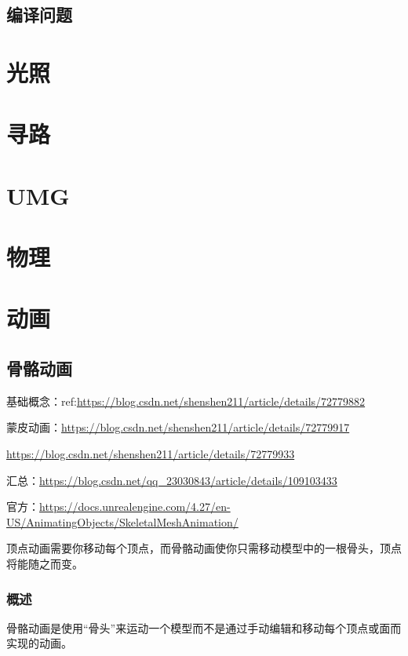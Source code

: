 \documentclass[UTF8,a4paper,12pt]{ctexbook}
\begin{document}
	\section{编译问题}
	
	




\chapter{光照}
	
\chapter{寻路}
	
\chapter{UMG}
		
\chapter{物理}
		
\chapter{动画}
	\section{骨骼动画}
	
		基础概念：ref:\url{https://blog.csdn.net/shenshen211/article/details/72779882}
		
		蒙皮动画：\url{https://blog.csdn.net/shenshen211/article/details/72779917}
		
		\url{https://blog.csdn.net/shenshen211/article/details/72779933}
		
		汇总：\url{https://blog.csdn.net/qq_23030843/article/details/109103433}
		
		官方：\url{https://docs.unrealengine.com/4.27/en-US/AnimatingObjects/SkeletalMeshAnimation/}
	
		顶点动画需要你移动每个顶点，而骨骼动画使你只需移动模型中的一根骨头，顶点将能随之而变。
		
		\subsection{概述}
			骨骼动画是使用“骨头”来运动一个模型而不是通过手动编辑和移动每个顶点或面而实现的动画。
			
\end{document}
